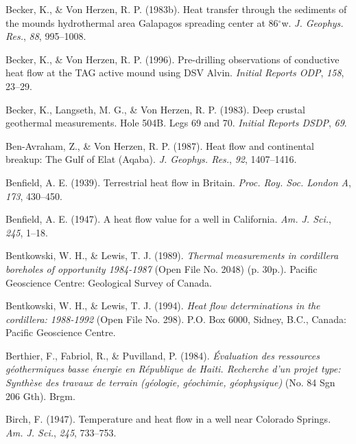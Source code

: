 \documentclass[draft,linenumbers]{agujournal2018}
\begin{document}
\leavevmode{}%
Becker, K., \& Von Herzen, R. P. (1983b). Heat transfer through the
sediments of the mounds hydrothermal area {Galapagos} spreading center
at 86\(^\circ\)w. \emph{J. Geophys. Res.}, \emph{88}, 995--1008.

\leavevmode{}%
Becker, K., \& Von Herzen, R. P. (1996). Pre-drilling observations of
conductive heat flow at the TAG active mound using DSV {Alvin}.
\emph{Initial Reports ODP}, \emph{158}, 23--29.

\leavevmode{}%
Becker, K., Langseth, M. G., \& Von Herzen, R. P. (1983). Deep crustal
geothermal measurements. Hole 504B. Legs 69 and 70. \emph{Initial
Reports DSDP}, \emph{69}.

\leavevmode{}%
Ben-Avraham, Z., \& Von Herzen, R. P. (1987). Heat flow and continental
breakup: The {Gulf of Elat (Aqaba)}. \emph{J. Geophys. Res.}, \emph{92},
1407--1416.

\leavevmode{}%
Benfield, A. E. (1939). Terrestrial heat flow in {Britain}. \emph{Proc.
Roy. Soc. London A}, \emph{173}, 430--450.

\leavevmode{}%
Benfield, A. E. (1947). A heat flow value for a well in {California}.
\emph{Am. J. Sci.}, \emph{245}, 1--18.

\leavevmode{}%
Bentkowski, W. H., \& Lewis, T. J. (1989). \emph{Thermal measurements in
cordillera boreholes of opportunity 1984-1987} (Open File No. 2048) (p.
30p.). Pacific Geoscience Centre: Geological Survey of Canada.

\leavevmode{}%
Bentkowski, W. H., \& Lewis, T. J. (1994). \emph{Heat flow
determinations in the cordillera: 1988-1992} (Open File No. 298). P.O.
Box 6000, Sidney, B.C., Canada: Pacific Geoscience Centre.

\leavevmode{}%
Berthier, F., Fabriol, R., \& Puvilland, P. (1984). \emph{Évaluation des
ressources géothermiques basse énergie en {République} de {Haiti}.
{Recherche} d'un projet type: Synthèse des travaux de terrain (géologie,
géochimie, géophysique)} (No. 84 Sgn 206 Gth). Brgm.

\leavevmode{}%
Birch, F. (1947). Temperature and heat flow in a well near {Colorado
Springs}. \emph{Am. J. Sci.}, \emph{245}, 733--753.
\end{document}

